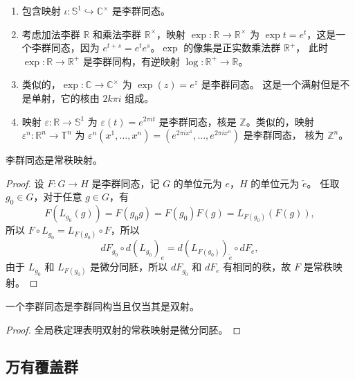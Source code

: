 \begin{example}[李群同态]
  \mbox{}
  \begin{enumerate}
    \item 包含映射 $\iota:\mathbb{S}^1\hookrightarrow \mathbb{C}^\times$ 是李群同态。
    \item 考虑加法李群 $\mathbb{R}$ 和乘法李群 $\mathbb{R}^\times$，映射 $\exp:\mathbb{R}\to \mathbb{R}^\times$
    为 $\exp t=e^t$，这是一个李群同态，因为 $e^{t+s}=e^te^s$。$\exp$ 的像集是正实数乘法群 $\mathbb{R}^+$，
    此时 $\exp:\mathbb{R}\to \mathbb{R}^+$ 是李群同构，有逆映射 $\log:\mathbb{R}^+\to \mathbb{R}$。
    \item 类似的，$\exp:\mathbb{C}\to \mathbb{C}^\times$ 为 $\exp(z)=e^z$ 是李群同态。
    这是一个满射但是不是单射，它的核由 $2k\pi i$ 组成。
    \item 映射 $\varepsilon:\mathbb{R}\to \mathbb{S}^1$ 为 $\varepsilon(t)=e^{2\pi it}$
    是李群同态，核是 $\mathbb{Z}$。类似的，映射 $\varepsilon^n:\mathbb{R}^n\to \mathbb{T}^n$
    为 $\varepsilon^n(x^1,\dots,x^n)=(e^{2\pi ix^1},\dots,e^{2\pi ix^n})$ 是李群同态，
    核为 $\mathbb{Z}^n$。
  \end{enumerate}
\end{example}

\begin{theorem}
  李群同态是常秩映射。
\end{theorem} 
\begin{proof}
  设 $F:G\to H$ 是李群同态，记 $G$ 的单位元为 $e$，$H$ 的单位元为 $\tilde{e}$。
  任取 $g_0\in G$，对于任意 $g\in G$，有
  \[
    F(L_{g_0}(g))=F(g_0g)=F(g_0)F(g)=L_{F(g_0)}(F(g)),  
  \] 
  所以 $F\circ L_{g_0}=L_{F(g_0)}\circ F$，所以
  \[
    dF_{g_0}\circ d\left(L_{g_0}\right)_e=d\left(L_{F(g_0)}\right)_{\tilde{e}}\circ dF_e,  
  \]
  由于 $L_{g_0}$ 和 $L_{F(g_0)}$ 是微分同胚，所以 $dF_{g_0}$ 和 $dF_e$
  有相同的秩，故 $F$ 是常秩映射。
\end{proof}

\begin{corollary}
  一个李群同态是李群同构当且仅当其是双射。
\end{corollary}
\begin{proof}
  全局秩定理表明双射的常秩映射是微分同胚。
\end{proof}

\subsection{万有覆盖群}

